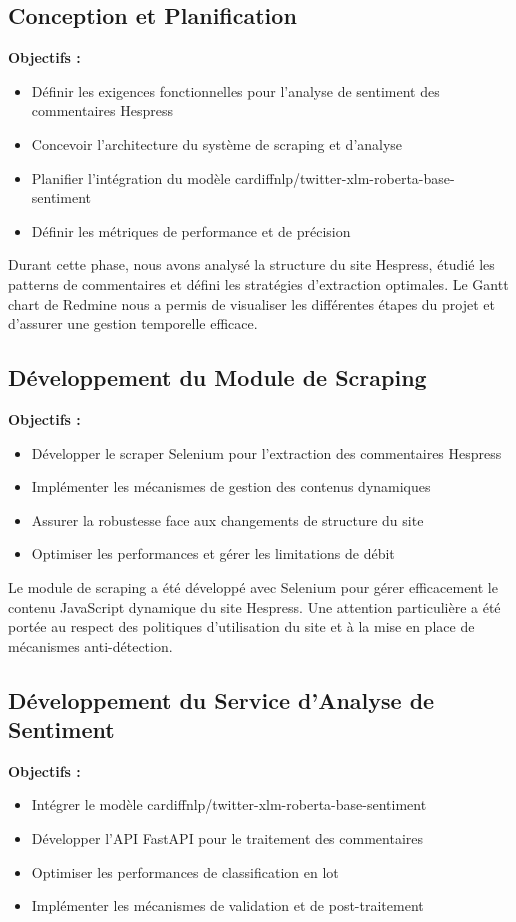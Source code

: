 \subsection{Conception et Planification}
\textbf{Objectifs :}
\begin{itemize}
    \item Définir les exigences fonctionnelles pour l'analyse de sentiment des commentaires Hespress
    \item Concevoir l'architecture du système de scraping et d'analyse
    \item Planifier l'intégration du modèle cardiffnlp/twitter-xlm-roberta-base-sentiment
    \item Définir les métriques de performance et de précision
\end{itemize}

Durant cette phase, nous avons analysé la structure du site Hespress, étudié les patterns de commentaires et défini les stratégies d'extraction optimales. Le Gantt chart de Redmine nous a permis de visualiser les différentes étapes du projet et d'assurer une gestion temporelle efficace.

\subsection{Développement du Module de Scraping}
\textbf{Objectifs :}
\begin{itemize}
    \item Développer le scraper Selenium pour l'extraction des commentaires Hespress
    \item Implémenter les mécanismes de gestion des contenus dynamiques
    \item Assurer la robustesse face aux changements de structure du site
    \item Optimiser les performances et gérer les limitations de débit
\end{itemize}

Le module de scraping a été développé avec Selenium pour gérer efficacement le contenu JavaScript dynamique du site Hespress. Une attention particulière a été portée au respect des politiques d'utilisation du site et à la mise en place de mécanismes anti-détection.

\subsection{Développement du Service d'Analyse de Sentiment}
\textbf{Objectifs :}
\begin{itemize}
    \item Intégrer le modèle cardiffnlp/twitter-xlm-roberta-base-sentiment
    \item Développer l'API FastAPI pour le traitement des commentaires
    \item Optimiser les performances de classification en lot
    \item Implémenter les mécanismes de validation et de post-traitement
\end{itemize}

